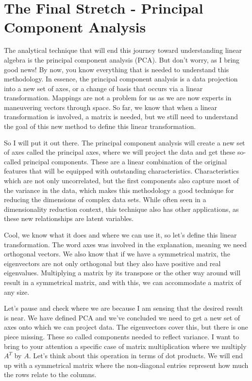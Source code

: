 \documentclass[600paper, 11pt,twoside,openany]{kdp}
\begin{document}
\chapter{The Final Stretch - Principal Component Analysis}
\indent The analytical technique that will end this journey toward understanding linear algebra is the principal component analysis (PCA). But don’t worry, as I bring good news! By now, you know everything that is needed to understand this methodology. In essence, the principal component analysis is a data projection into a new set of axes, or a change of basis that occurs via a linear transformation. Mappings are not a problem for us as we are now experts in maneuvering vectors through space. So far, we know that when a linear transformation is involved, a matrix is needed, but we still need to understand the goal of this new method to define this linear transformation. 
\par 
\vspace{-3pt}
\indent So I will put it out there. The principal component analysis will create a new set of axes called the principal axes, where we will project the data and get these so-called principal components. These are a linear combination of the original features that will be equipped with outstanding characteristics. Characteristics which are not only uncorrelated, but the first components also capture most of the variance in the data, which makes this methodology a good technique for reducing the dimensions of complex data sets. While often seen in a dimensionality reduction context, this technique also has other applications, as these new relationships are latent variables.
\par 
\vspace{-3pt}
\indent Cool, we know what it does and where we can use it, so let’s define this linear transformation. The word axes was involved in the explanation, meaning we need orthogonal vectors. We also know that if we have a symmetrical matrix, the eigenvectors are not only orthogonal but they also have positive and real eigenvalues. Multiplying a matrix by its transpose or the other way around will result in a symmetrical matrix, and with this, we can accommodate a matrix of any size. 
\par 
\vspace{-3pt}
\indent Let’s pause and check where we are because I am sensing that the desired result is near. We have defined PCA and we’ve concluded we need to get a new set of axes onto which we can project data. The eigenvectors cover this, but there is one piece missing. These so called components needed to reflect variance. I want to bring to your attention a specific case of matrix multiplication where we multiply $A^T$ by $A$. Let’s think about this operation in terms of dot products. We will end up with a symmetrical matrix where the non-diagonal entries represent how much the rows relate to the columns. 
\end{document}
